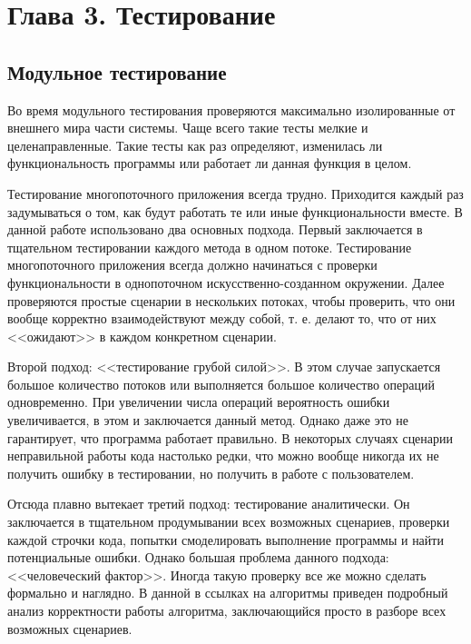 \documentclass[12pt]{article}
\begin{document}
{		\newpage
		
		\section{Глава 3. Тестирование}
				\subsection{Модульное тестирование}
					\par Во время модульного тестирования проверяются максимально изолированные от внешнего мира части системы. Чаще всего такие тесты мелкие и целенаправленные. Такие тесты как раз определяют, изменилась ли функциональность программы или работает ли данная функция в целом.
					\par Тестирование многопоточного приложения всегда трудно. Приходится каждый раз задумываться о том, как будут работать те или иные функциональности вместе. В данной работе использовано два основных подхода. Первый заключается в тщательном тестировании каждого метода в одном потоке. Тестирование многопоточного приложения всегда должно начинаться с проверки функциональности в однопоточном искусственно-созданном окружении. Далее проверяются простые сценарии в нескольких потоках, чтобы проверить, что они вообще корректно взаимодействуют между собой, т. е. делают то, что от них <<ожидают>> в каждом конкретном сценарии.
					\par Второй подход: <<тестирование грубой силой>>. В этом случае запускается большое количество потоков или выполняется большое количество операций одновременно. При увеличении числа операций вероятность ошибки увеличивается, в этом и заключается данный метод. Однако даже это не гарантирует, что программа работает правильно. В некоторых случаях сценарии неправильной работы кода настолько редки, что можно вообще никогда их не получить ошибку в тестировании, но получить в работе с пользователем.
					\par Отсюда плавно вытекает третий подход: тестирование аналитически. Он заключается в тщательном продумывании всех возможных сценариев, проверки каждой строчки кода, попытки смоделировать выполнение программы и найти потенциальные ошибки. Однако большая проблема данного подхода: <<человеческий фактор>>. Иногда такую проверку все же можно сделать формально и наглядно. В данной в ссылках на алгоритмы приведен подробный анализ корректности работы алгоритма, заключающийся просто в разборе всех возможных сценариев.
}
\end{document}

